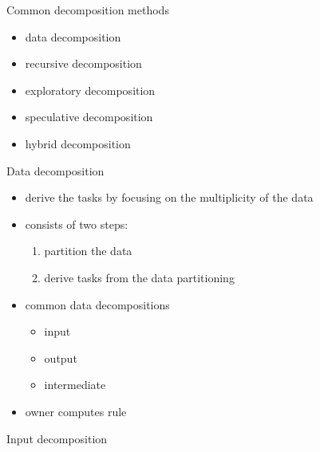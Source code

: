 \documentclass[10pt, t]{beamer}
\begin{document}
  \begin{frame}{Common decomposition methods}
    \begin{itemize}
      \item data decomposition
      \item recursive decomposition
      \item exploratory decomposition
      \item speculative decomposition
      \item hybrid decomposition
    \end{itemize}

  \end{frame}

  \begin{frame}{Data decomposition}
    \begin{itemize}
      \item derive the tasks by focusing on the multiplicity of the data
      \item consists of two steps:
        \begin{enumerate}
          \item partition the data
          \item derive tasks from the data partitioning
        \end{enumerate}
      \item common data decompositions
        \begin{itemize}
          \item input
          \item output
          \item intermediate
        \end{itemize}
      \item owner computes rule
    \end{itemize}

  \end{frame}

  \begin{frame}{Input decomposition}
  \end{frame}
\end{document}

